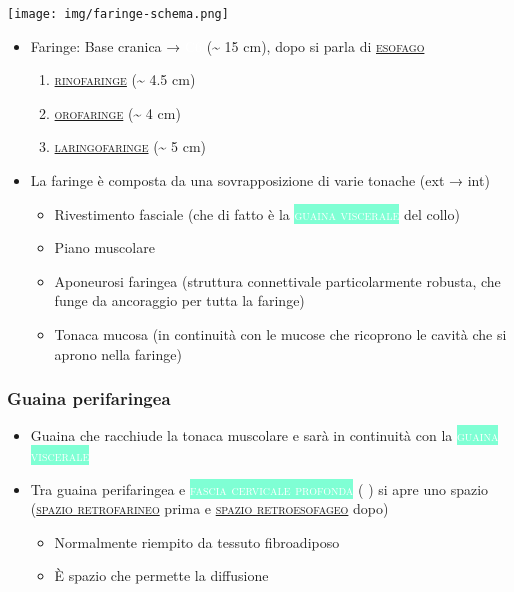 \documentclass[italian,]{article}
\providecommand{\tightlist}{%
  \setlength{\itemsep}{0pt}\setlength{\parskip}{0pt}}
\newcommand{\oss}[1]{\colorbox{ossa}{\textcolor{white}{\textsc{#1}}}}
\newcommand{\tol}[1]{\colorbox{Aquamarine}{\textcolor{white}{\textsc{#1}}}}
\renewcommand{\a}[1]{\underline{\textsc{#1}}}
\newcommand{\nnetter}[1]{ \fbox{\textsf{Netter (2018), plate #1}} }
\begin{document}
\centering

\texttt{[image: img/faringe-schema.png]}~
\justify

\begin{itemize}
\tightlist
\item
  Faringe: Base cranica → \oss{C6} (\textasciitilde{} 15 cm), dopo si
  parla di \a{esofago}

  \begin{enumerate}
  \def\labelenumi{\arabic{enumi}.}
  \tightlist
  \item
    \a{rinofaringe} (\textasciitilde{} 4.5 cm)
  \item
    \a{orofaringe} (\textasciitilde{} 4 cm)
  \item
    \a{laringofaringe} (\textasciitilde{} 5 cm)
  \end{enumerate}
\item
  La faringe è composta da una sovrapposizione di varie tonache (ext →
  int)

  \begin{itemize}
  \tightlist
  \item
    Rivestimento fasciale (che di fatto è la \tol{guaina viscerale} del
    collo)
  \item
    Piano muscolare
  \item
    Aponeurosi faringea (struttura connettivale particolarmente robusta,
    che funge da ancoraggio per tutta la faringe)
  \item
    Tonaca mucosa (in continuità con le mucose che ricoprono le cavità
    che si aprono nella faringe)
  \end{itemize}
\end{itemize}

\hypertarget{guaina-perifaringea}{%
\subsubsection{Guaina perifaringea}\label{guaina-perifaringea}}

\begin{itemize}
\tightlist
\item
  Guaina che racchiude la tonaca muscolare e sarà in continuità con la
  \tol{guaina viscerale}
\item
  Tra guaina perifaringea e \tol{fascia cervicale profonda} (\nnetter{})
  si apre uno spazio (\a{spazio retrofarineo} prima e
  \a{spazio retroesofageo} dopo)

  \begin{itemize}
  \tightlist
  \item
    Normalmente riempito da tessuto fibroadiposo
  \item
    È spazio che permette la diffusione
  \end{itemize}
\end{itemize}
\end{document}
